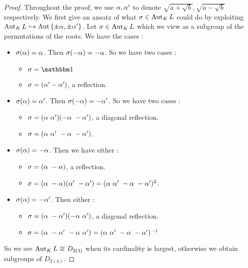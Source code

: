 \documentclass{article}
\begin{document}
\begin{proof}
  Throughout the proof,
  we use $\alpha, \alpha'$ to denote $\sqrt{a + \sqrt{b}}, \sqrt{a - \sqrt{b}}$
  respectively. 
  We first give an ansatz of what $\sigma \in \operatorname{Aut}_K L$ could do 
  by exploiting $\operatorname{Aut}_K L \hookrightarrow \operatorname{Aut}\left\{\pm\alpha,\pm\alpha'\right\}$.
  Let $\sigma \in \operatorname{Aut}_K L$ which we view as a subgroup of the permutations of 
  the roots. We have the cases : 
  \begin{itemize}
    \item $\sigma(\alpha) = \alpha$. Then $\sigma(-\alpha) = -\alpha$.
    So we have two cases : 
    \begin{itemize}
      \item $\si = \id{}$
      \item $\sigma = (\alpha' -\alpha')$, a reflection.
    \end{itemize}
    \item $\sigma(\alpha) = \alpha'$. Then $\sigma(-\alpha) = -\alpha'$.
    So we have two cases : 
    \begin{itemize}
      \item $\sigma = (\alpha \,\,\alpha') (-\alpha \,\, -\alpha')$, a diagonal reflection.
      \item $\sigma = (\alpha \,\, \alpha' \,\, -\alpha \,\, -\alpha')$.
    \end{itemize}
    \item $\sigma(\alpha) = -\alpha$. Then we have either : 
    \begin{itemize}
      \item $\sigma = (\alpha \,\, -\alpha)$, a reflection.
      \item $\sigma = (\alpha \,\, -\alpha) (\alpha' \,\, -\alpha')
      = (\alpha \,\, \alpha' \,\, -\alpha \,\, -\alpha')^2$.
    \end{itemize}
    \item $\sigma(\alpha) = -\alpha'$. Then either : 
    \begin{itemize}
      \item $\sigma = (\alpha \,\, -\alpha') (-\alpha \,\, \alpha')$, a diagonal reflection.
      \item $\sigma = (\alpha \,\, -\alpha' \,\, -\alpha \,\, \alpha')
      = (\alpha \,\, \alpha' \,\, -\alpha \,\, -\alpha')^{-1}$
    \end{itemize}
  \end{itemize}
  So we see $\operatorname{Aut}_K L \cong_{} D_{2(4)}$ when its cardinality is largest,
  otherwise we obtain subgroups of $D_{2(4)}$.


\end{proof}
\end{document}
